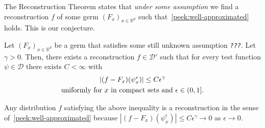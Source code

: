 The Reconstruction Theorem states that \emph{under some assumption} we find a reconstruction \( f \) of some germ \( (F_x)_{x \in \mathbb{R}^d} \) such that~\eqref{peek:well-approximated} holds. This is our conjecture.

\begin{conjecture}\label{peek:conjecture}
    Let \({(F_x)}_{x \in \mathbb{R}^d}\) be a germ that satisfies some still unknown assumption \emph{\texttt{???}}. Let \( \gamma > 0 \). Then, there exists a reconstruction \(f \in \mathcal{D}'\) such that for every test function \(\psi \in \mathcal{D}\) there exists \(C < {\infty}\) with
    \begin{gather}\label{peek:eq:conjecture}
        |(f-F_x)(\psi^\epsilon_x)| \leq C \epsilon^{\gamma} \\
        \text{uniformly for \(x\) in compact sets and \( \epsilon \in (0,1] \)} \nonumber. %
    \end{gather}
    
\end{conjecture}

Any distribution \(f\) satisfying the above inequality is a reconstruction in the sense of~\eqref{peek:well-approximated} because \(|(f-F_x)(\psi^\epsilon_x)| \leq C  \epsilon^{\gamma} \to 0\) as \(\epsilon \to 0\).

